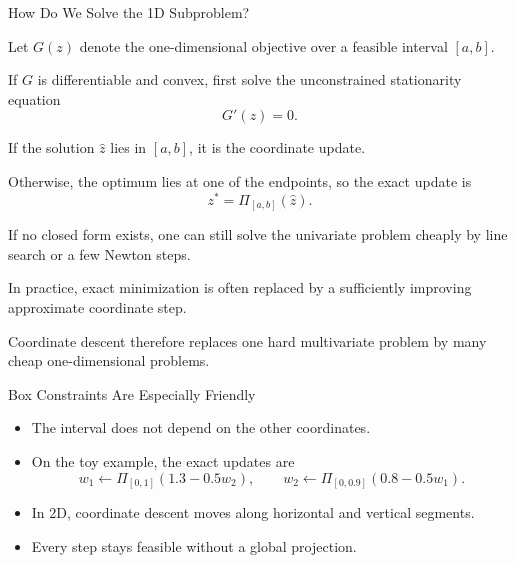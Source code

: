 \documentclass[11pt,compress,t,notes=noshow, xcolor=table]{beamer}
\begin{document}
\begin{framei}[fs=small]{How Do We Solve the 1D Subproblem?}
\item Let $G(z)$ denote the one-dimensional objective over a feasible interval $[a,b]$.
\item If $G$ is differentiable and convex, first solve the unconstrained stationarity equation
$$
G'(z) = 0.
$$
\item If the solution $\hat z$ lies in $[a,b]$, it is the coordinate update.
\item Otherwise, the optimum lies at one of the endpoints, so the exact update is
$$
z^\ast = \Pi_{[a,b]}(\hat z).
$$
\item If no closed form exists, one can still solve the univariate problem cheaply by line search or a few Newton steps.
\item In practice, exact minimization is often replaced by a sufficiently improving approximate coordinate step.
\item Coordinate descent therefore replaces one hard multivariate problem by many cheap one-dimensional problems.
\end{framei}


\begin{framev}[fs=small]{Box Constraints Are Especially Friendly}
\begin{itemize}
\item The interval does not depend on the other coordinates.
\item On the toy example, the exact updates are
\[
w_1 \leftarrow \Pi_{[0,1]}(1.3 - 0.5 w_2),
\qquad
w_2 \leftarrow \Pi_{[0,0.9]}(0.8 - 0.5 w_1).
\]
\item In 2D, coordinate descent moves along horizontal and vertical segments.
\item Every step stays feasible without a global projection.
\end{itemize}
\end{framev}
\end{document}
